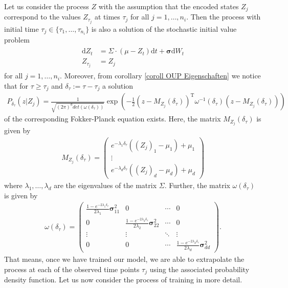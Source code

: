 \documentclass[11pt,titlepage]{article}
\theoremstyle{definition}
\theoremstyle{remark}
\begin{document}
	Let us consider the process $Z$ with the assumption that the encoded states $Z_j$ correspond to the values $Z_{\tau_j}$ at times $\tau_j$ for all $j=1,\ldots,n_i$. Then the process with initial time $\tau_j\in\{\tau_1,\ldots,\tau_{n_i}\}$ is also a solution of the stochastic initial value problem
	\begin{align*}
		\begin{split}
			\mathrm{d}Z_t &= \Sigma\cdot (\mu-Z_t)\mathrm{d}t +\boldsymbol{\sigma} \mathrm{d}W_t\\
			Z_{\tau_j}&=Z_j
		\end{split}
	\end{align*}
	for all $j=1,\ldots,n_i$. 
	Moreover, from corollary \ref{coroll OUP Eigenschaften} we notice that for $\tau\geq \tau_j$ and $\delta_\tau := \tau-\tau_j$ a solution
	\begin{align}
		P_{\delta_\tau}(z\vert Z_j) = \frac{1}{\sqrt{(2\pi)^d det(\omega(\delta_\tau))}}\exp\left(-\frac{1}{2}(z- M_{Z_j}(\delta_\tau))^{\text{T}}\omega^{-1}(\delta_\tau)(z-M_{Z_j}(\delta_\tau))\right) \label{transition prob}
	\end{align}
	of the corresponding Fokker-Planck equation exists. Here, the matrix $M_{Z_j}(\delta_\tau)$ is given by
	\begin{align}\label{OUP Ewert}
		M_{Z_j}(\delta_\tau)
		= \begin{pmatrix}
			e^{-\lambda_1 \delta_\tau} ((Z_j)_1 - \mu_1) + \mu_1 \\
			\vdots \\
			e^{-\lambda_d \delta_\tau} ((Z_j)_d - \mu_d) + \mu_d
		\end{pmatrix}
	\end{align}
	where $\lambda_1,\ldots,\lambda_d$ are the eigenvalues of the matrix $\Sigma$. Further, the matrix $\omega(\delta_\tau)$ is given by
	\begin{align}\label{OUP Covmat}
		\omega(\delta_\tau) = \begin{pmatrix}
			\frac{1- e^{-2\lambda_1 \delta_\tau}}{2\lambda_1} \boldsymbol{\sigma}_{11}^2  & 0 &\cdots & 0 \\
			0 & \frac{1- e^{-2\lambda_2 \delta_\tau}}{2\lambda_2} \boldsymbol{\sigma}_{22}^2  & \cdots & 0 \\
			\vdots & \vdots & \ddots & \vdots \\
			0 & 0 & \cdots & \frac{1- e^{-2\lambda_d \delta_\tau}}{2\lambda_d} \boldsymbol{\sigma}_{dd}^2 
		\end{pmatrix}.
	\end{align}
	That means, once we have trained our model, we are able to extrapolate the process at each of the observed time points $\tau_j$ using the associated probability density function. Let us now 
	consider the process of training in more detail.
	
\end{document}
